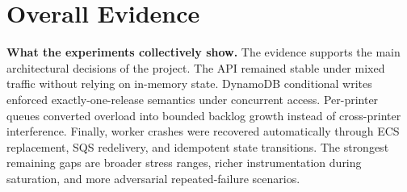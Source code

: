 \documentclass[10pt,letterpaper]{article}
\begin{document}
\section*{Overall Evidence}
\begin{tcolorbox}[colback=surface,colframe=border,boxrule=0.5pt,arc=2pt,left=6pt,right=6pt,top=4pt,bottom=4pt]
\textbf{What the experiments collectively show.} The evidence supports the main architectural decisions of the project. The API remained stable under mixed traffic without relying on in-memory state. DynamoDB conditional writes enforced exactly-one-release semantics under concurrent access. Per-printer queues converted overload into bounded backlog growth instead of cross-printer interference. Finally, worker crashes were recovered automatically through ECS replacement, SQS redelivery, and idempotent state transitions. The strongest remaining gaps are broader stress ranges, richer instrumentation during saturation, and more adversarial repeated-failure scenarios.
\end{tcolorbox}
\end{document}
